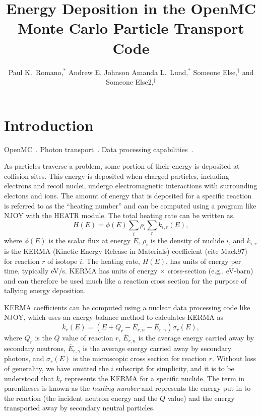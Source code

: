 \documentclass{anstrans}
\title{Energy Deposition in the OpenMC Monte Carlo Particle Transport Code}
\author{Paul K.~Romano,$\!^{*}$ Andrew E. Johnson Amanda L.~Lund,$\!^{*}$ Someone Else,$^{\dagger}$ and Someone Else2,$^{\dagger}$}
\institute{
$^{*}$Computational Science Division, Argonne National Laboratory, 9700 S Cass Ave., Lemont, IL 60439, promano@anl.gov
\and
$^{\dagger}$MIT, ...
}
\begin{document}
\section{Introduction}

OpenMC~\cite{romano2015ane1}. Photon transport~\cite{lund2018anl}. Data
processing capabilities~\cite{romano2017epjwoc}.

As particles traverse a problem, some portion of their energy is deposited at
collision sites. This energy is deposited when charged particles, including
electrons and recoil nuclei, undergo electromagnetic interactions with
surrounding electons and ions. The amount of energy that is deposited for a
specific reaction is referred to as the ``heating number'' and can be computed
using a program like NJOY with the HEATR module. The total heating rate can be
written as,
\begin{equation}
    H(E) = \phi(E)\sum_i \rho_i \sum_r k_{i, r}(E),
\end{equation}
where $\phi(E)$ is the scalar flux at energy $E$, $\rho_i$ is the density of
nuclide $i$, and $k_{i, r}$ is the KERMA (Kinetic Energy Release in Materials)
coefficient (cite Mack97) for reaction $r$ of isotope $i$. The heating rate,
$H(E)$, has units of energy per time, typically eV/s. KERMA has units of energy
$\times$ cross-section (e.g., eV-barn) and can therefore be used much like a
reaction cross section for the purpose of tallying energy deposition.

KERMA coefficients can be computed using a nuclear data processing code like
NJOY, which uses an energy-balance method to calculates KERMA as
\begin{equation}
    k_r(E) = \left(E + Q_r - \bar{E}_{r, n}
    - \bar{E}_{r, \gamma}\right)\sigma_{r}(E),
\end{equation}
where $Q_r$ is the $Q$ value of reaction $r$, $\bar{E}_{r,n}$ is the average
energy carried away by secondary neutrons, $\bar{E}_{r,\gamma}$ is the average
energy carried away by secondary photons, and $\sigma_r(E)$ is the microscopic
cross section for reaction $r$. Without loss of generality, we have omitted the
$i$ subscript for simplicity, and it is to be understood that $k_r$ represents
the KERMA for a specific nuclide. The term in parentheses is known as the
\emph{heating number} and represents the energy put in to the reaction (the
incident neutron energy and the $Q$ value) and the energy transported away by
secondary neutral particles.
\end{document}
